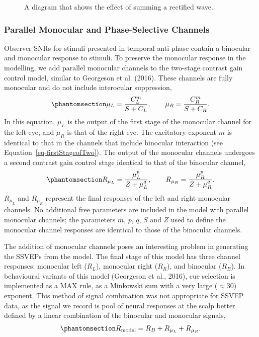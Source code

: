 \documentclass[
  12pt,
]{article}
\begin{document}
\begin{figure}


\caption{\label{fig-sumDiagram}A diagram that shows the effect of
summing a rectified wave.}

\end{figure}%

\subsubsection{Parallel Monocular and Phase-Selective
Channels}\label{parallel-monocular-and-phase-selective-channels}

Observer SNRs for stimuli presented in temporal anti-phase contain a
binocular and monocular response to stimuli. To preserve the monocular
response in the modelling, we add parallel monocular channels to the
two-stage contrast gain control model, similar to Georgeson et al.
(2016). These channels are fully monocular and do not include
interocular suppression,
\begin{equation}\phantomsection\label{eq-monocFirstStage}{
\mu_L = \frac{C_L^m}{S + C_L}, \qquad  \mu_R = \frac{C_R^m}{S + C_R}.
}\end{equation} In this equation, \(\mu_L\) is the output of the first
stage of the monocular channel for the left eye, and \(\mu_R\) is that
of the right eye. The excitatory exponent \(m\) is identical to that in
the channels that include binocular interaction (see
Equation~\ref{eq-firstStageofTwo}). The output of the monocular channels
undergoes a second contrast gain control stage identical to that of the
binocular channel,
\begin{equation}\phantomsection\label{eq-monocSecondStage}{
R_{\mu_L} = \frac{\mu_L^p}{Z + \mu_L^q}, \qquad  R_{\mu_R} = \frac{\mu_R^p}{Z + \mu_R^q}.
}\end{equation} \(R_{\mu_L}\) and \(R_{\mu_R}\) represent the final
responses of the left and right monocular channels. No additional free
parameters are included in the model with parallel monocular channels;
the parameters \(m\), \(p\), \(q\), \(S\) and \(Z\) used to define the
monocular channel responses are identical to those of the binocular
channels.

The addition of monocular channels poses an interesting problem in
generating the SSVEPs from the model. The final stage of this model has
three channel responses: monocular left (\(R_L\)), monocular right
(\(R_R\)), and binocular (\(R_B\)). In behavioural variants of this
model (Georgeson et al., 2016), cue selection is implemented as a MAX
rule, as a Minkowski sum with a very large (\(\approx 30\)) exponent.
This method of signal combination was not appropriate for SSVEP data, as
the signal we record is pool of neural responses at the scalp better
defined by a linear combination of the binocular and monocular signals,
\begin{equation}\phantomsection\label{eq-binocMonocComb}{  
R_\text{model}=R_B+R_{\mu_L}+R_{\mu_R}.
}\end{equation}
\end{document}
